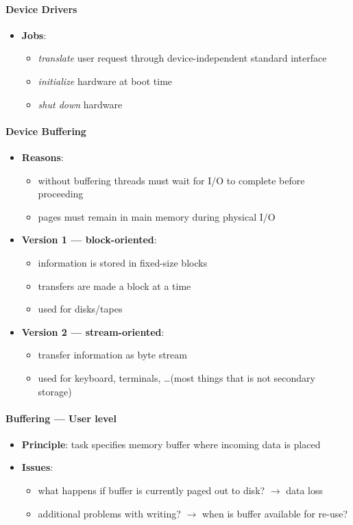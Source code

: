 \paragraph{Device Drivers}
\begin{itemize}
  \item \textbf{Jobs}:
  \begin{itemize}
    \item \emph{translate} user request through device-independent standard interface 
    \item \emph{initialize} hardware at boot time 
    \item \emph{shut down} hardware
  \end{itemize}
\end{itemize}

\paragraph{Device Buffering}
\begin{itemize}
  \item \textbf{Reasons}:
  \begin{itemize}
    \item without buffering threads must wait for I/O to complete before proceeding 
    \item pages must remain in main memory during physical I/O
  \end{itemize}
  \item \textbf{Version 1 --- block-oriented}:
  \begin{itemize}
    \item information is stored in fixed-size blocks 
    \item transfers are made a block at a time 
    \item used for disks/tapes
  \end{itemize}
  \item \textbf{Version 2 --- stream-oriented}:
  \begin{itemize}
    \item transfer information as byte stream 
    \item used for keyboard, terminals, \dots (most things that is not secondary storage)
  \end{itemize}
\end{itemize}

\paragraph{Buffering --- User level}
\begin{itemize}
  \item \textbf{Principle}: task specifies memory buffer where incoming data is placed
  \item \textbf{Issues}:
  \begin{itemize}
    \item what happens if buffer is currently paged out to disk? $ \to $ data loss 
    \item additional problems with writing? $ \to $ when is buffer available for re-use?
  \end{itemize}
\end{itemize}

